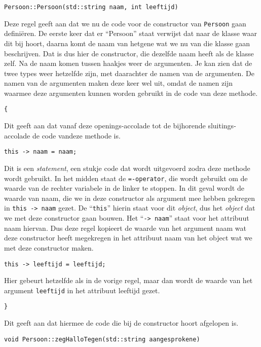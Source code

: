 \documentclass{article}
\begin{document}
\begin{lstlisting}[frame=none]
Persoon::Persoon(std::string naam, int leeftijd)
\end{lstlisting}

Deze regel geeft aan dat we nu de code voor de constructor van \texttt{Persoon} gaan definiëren. De eerste keer dat er “Persoon” staat verwijst dat naar de klasse waar dit bij hoort, daarna komt de naam van hetgene wat we nu van die klasse gaan beschrijven. Dat is dus hier de constructor, die dezelfde naam heeft als de klasse zelf. Na de naam komen tussen haakjes weer de argumenten. Je kan zien dat de twee types weer hetzelfde zijn, met daarachter de namen van de argumenten. De namen van de argumenten maken deze keer wel uit, omdat de namen zijn waarmee deze argumenten kunnen worden gebruikt in de code van deze methode.

\begin{lstlisting}[frame=none]
{
\end{lstlisting}

Dit geeft aan dat vanaf deze openings-accolade tot de bijhorende sluitings-accolade de code vandeze methode is.

\begin{lstlisting}[frame=none]
this -> naam = naam;
\end{lstlisting}

Dit is een \emph{statement}, een stukje code dat wordt uitgevoerd zodra deze methode wordt gebruikt. In het midden staat de \texttt{=-operator}, die wordt gebruikt om de waarde van de rechter variabele in de linker te stoppen. In dit geval wordt de waarde van naam, die we in deze constructor als argument mee hebben gekregen in \texttt{this -> naam} gezet. De “\texttt{this}” hierin staat voor dit \emph{object}, dus het \emph{object} dat we met deze constructor gaan bouwen. Het “\texttt{-> naam}” staat voor het attribuut naam hiervan. Dus deze regel kopieert de waarde van het argument naam wat deze constructor heeft megekregen in het attribuut naam van het object wat we met deze constructor maken.

\begin{lstlisting}[frame=none]
this -> leeftijd = leeftijd;
\end{lstlisting}

Hier gebeurt hetzelfde als in de vorige regel, maar dan wordt de waarde van het argument \texttt{leeftijd} in het attribuut leeftijd gezet.

\begin{lstlisting}[frame=none]
}
\end{lstlisting}

Dit geeft aan dat hiermee de code die bij de constructor hoort afgelopen is.

\begin{lstlisting}[frame=none]
void Persoon::zegHalloTegen(std::string aangesprokene)
\end{lstlisting}
\end{document}
